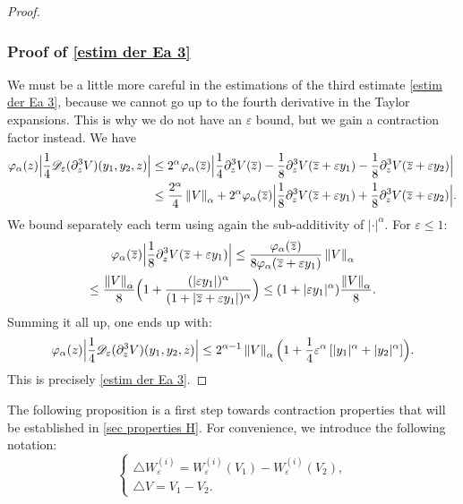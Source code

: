 \documentclass[JEP,XML,SOM,Unicode]{cedram}
\let\mathcal\mathscr
\theoremstyle{plain}
\theoremstyle{definition}
\newcommand{\D}{\mathcal{D}_\eps}
\let\eps\varepsilon
\newcommand{\abs}[1]{\left\lvert#1\right\rvert}
\newcommand{\nalph}[1]{\left\lVert#1\right\rVert_\alpha}
\newcommand{\bz}{\overline{z}}
\newcommand{\vphia}{\varphi_\alpha}
\begin{document}
\begin{proof}
\subsubsection*{Proof of \eqref{estim der Ea 3}}
We must be a little more careful in the estimations of the third estimate \eqref{estim der Ea 3}, because we cannot go up to the fourth derivative in the Taylor expansions. This is why we do not have an $\eps$ bound, but we gain a contraction factor instead. We have
\begin{align*}
\vphia(z) \Bigl| \dfrac{1}{4} \D(\partial_z^3 V)(y_1,y_2,z) \Bigr| & \leq 2^{\alpha} \vphia(\bz) \Bigl | \dfrac{1}{4} \partial_z^3 V(\bz) -\dfrac{1}{8} \partial^3_z V(\bz+\eps y_1)-\dfrac{1}{8} \partial^3_z V(\bz+\eps y_2) \Bigr| \\
& \leq \dfrac{2^{\alpha}}{4} \nalph{V} +2^{\alpha}\vphia(\bz) \Bigl | \dfrac{1}{8} \partial^3_z V(\bz+\eps y_1)+\dfrac{1}{8} \partial^3_z V(\bz+\eps y_2) \Bigr|.
\end{align*}
We bound separately each term using again the sub-additivity of $\abs{\cdot}^\alpha$. For $\eps \leq 1$:
\begin{multline*}
\vphia(\bz) \Bigl | \dfrac{1}{8} \partial^3_z V(\bz+\eps y_1) \Bigr | \leq \dfrac{\vphia(\bz)} { 8 \vphia(\bz+\eps y_1) } \nalph{V} \\
\leq \dfrac{\nalph{V}}{8} \Bigl(1 + \dfrac{(|\eps y_1 |)^\alpha}{(1+|\bz+\eps y_1|)^\alpha} \Bigr) \leq (1 + |\eps y_1|^\alpha)\dfrac{\nalph{V}}{8}.
\end{multline*}
Summing it all up, one ends up with:
\begin{equation*}
\vphia(z) \Bigl | \dfrac{1}{4} \D(\partial_z^3 V)(y_1,y_2,z) \Bigr| \leq 2^{\alpha-1} \nalph{V} \Bigl(1+ \frac14 \eps^\alpha \left[\vert y_1 \vert^{\alpha}+ \vert y_2 \vert^{\alpha} \right] \Bigr).
\end{equation*}
This is precisely \cref{estim der Ea 3}.
\end{proof}

The following proposition is a first step towards contraction properties that will be established in \cref{sec properties H}. For convenience, we introduce the following notation:
\begin{equation*}
\begin{cases}
\triangle W_\eps^{(i)} = W^{(i)}_\eps(V_1)-W^{(i)}_\eps(V_2), \\
\triangle V = V_1-V_2.
\end{cases}
\end{equation*}
\end{document}
